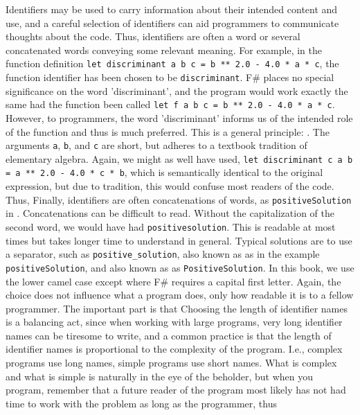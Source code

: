 \documentclass[fsharpNotes.tex]{subfiles}
\begin{document}
Identifiers may be used to carry information about their intended content and use, and a careful selection of identifiers can aid programmers to communicate thoughts about the code. Thus, identifiers are often a word or several concatenated words conveying some relevant meaning. For example, in the function definition \lstinline{let discriminant a b c = b ** 2.0 - 4.0 * a * c}, the function identifier has been chosen to be \lstinline{discriminant}. F\# places no special significance on the word 'discriminant', and the program would work exactly the same had the function been called \lstinline{let f a b c = b ** 2.0 - 4.0 * a * c}. However, to programmers, the word 'discriminant' informs us of the intended role of the function and thus is much preferred. This is a general principle: . The arguments \lstinline{a}, \lstinline{b}, and \lstinline{c} are short, but adheres to a textbook tradition of elementary algebra. Again, we might as well have used, \lstinline{let discriminant c a b = a ** 2.0 - 4.0 * c * b}, which is semantically identical to the original expression, but due to tradition, this would confuse most readers of the code. Thus,  Finally, identifiers are often concatenations of words, as \lstinline{positiveSolution} in . Concatenations can be difficult to read. Without the capitalization of the second word, we would have had \lstinline{positivesolution}. This is readable at most times but takes longer time to understand in general. Typical solutions are to use a separator, such as \lstinline{positive_solution},  also known as  as in the example \lstinline{positiveSolution}, and  also known as  as \lstinline{PositiveSolution}. In this book, we use the lower camel case except where F\# requires a capital first letter. Again, the choice does not influence what a program does, only how readable it is to a fellow programmer. The important part is that  Choosing the length of identifier names is a balancing act, since when working with large programs, very long identifier names can be tiresome to write, and a common practice is that the length of identifier names is proportional to the complexity of the program. I.e., complex programs use long names, simple programs use short names. What is complex and what is simple is naturally in the eye of the beholder, but when you program, remember that a future reader of the program most likely has not had time to work with the problem as long as the programmer, thus 
\end{document}
